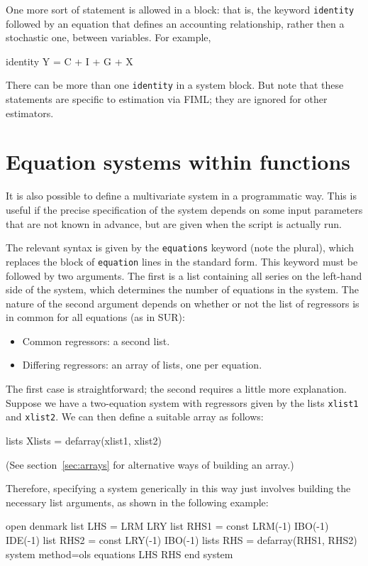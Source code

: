 One more sort of statement is allowed in a  block: that
is, the keyword \texttt{identity} followed by an equation that defines
an accounting relationship, rather then a stochastic one, between
variables. For example,

\begin{code}
  identity Y = C + I + G + X
\end{code}

There can be more than one \texttt{identity} in a system block. But
note that these statements are specific to estimation via FIML; they
are ignored for other estimators.

\section{Equation systems within functions}
\label{sec:system-in-func}

It is also possible to define a multivariate system in a programmatic
way. This is useful if the precise specification of the system depends
on some input parameters that are not known in advance, but are given
when the script is actually run.

The relevant syntax is given by the \texttt{equations} keyword (note
the plural), which replaces the block of \texttt{equation} lines in
the standard form. This keyword must be followed by two arguments. The
first is a list containing all series on the left-hand side of the
system, which determines the number of equations in the system. The
nature of the second argument depends on whether or not the list of
regressors is in common for all equations (as in SUR):
\begin{itemize}
\item Common regressors: a second list.
\item Differing regressors: an array of lists, one per equation.
\end{itemize}

The first case is straightforward; the second requires a little more
explanation. Suppose we have a two-equation system with regressors
given by the lists \texttt{xlist1} and \texttt{xlist2}. We can then
define a suitable array as follows:
\begin{code}
lists Xlists = defarray(xlist1, xlist2)
\end{code}
(See section~\ref{sec:arrays} for alternative ways of building an
array.)

Therefore, specifying a system generically in this way just involves 
building the necessary list arguments, as shown in the following
example:
\begin{code}
open denmark
list LHS = LRM LRY
list RHS1 = const LRM(-1) IBO(-1) IDE(-1)
list RHS2 = const LRY(-1) IBO(-1)
lists RHS = defarray(RHS1, RHS2)
system method=ols
     equations LHS RHS
end system
\end{code}

